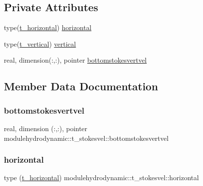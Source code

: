 \subsection*{Private Attributes}
\begin{DoxyCompactItemize}
\item 
type(\mbox{\hyperlink{structmodulehydrodynamic_1_1t__horizontal}{t\+\_\+horizontal}}) \mbox{\hyperlink{structmodulehydrodynamic_1_1t__stokesvel_a9c8ae72d899c079fe9eed738cd021514}{horizontal}}
\item 
type(\mbox{\hyperlink{structmodulehydrodynamic_1_1t__vertical}{t\+\_\+vertical}}) \mbox{\hyperlink{structmodulehydrodynamic_1_1t__stokesvel_a91dc4e35e7efe9179743bf03a1427122}{vertical}}
\item 
real, dimension(\+:,\+:), pointer \mbox{\hyperlink{structmodulehydrodynamic_1_1t__stokesvel_af5f3a19d386231a1abd4788e07168f13}{bottomstokesvertvel}}
\end{DoxyCompactItemize}


\subsection{Member Data Documentation}
\mbox{\label{structmodulehydrodynamic_1_1t__stokesvel_af5f3a19d386231a1abd4788e07168f13}} 
\subsubsection{\texorpdfstring{bottomstokesvertvel}{bottomstokesvertvel}}
{\footnotesize\ttfamily real, dimension (\+:,\+:), pointer modulehydrodynamic\+::t\+\_\+stokesvel\+::bottomstokesvertvel\hspace{0.3cm}{\ttfamily [private]}}

\mbox{\label{structmodulehydrodynamic_1_1t__stokesvel_a9c8ae72d899c079fe9eed738cd021514}} 
\subsubsection{\texorpdfstring{horizontal}{horizontal}}
{\footnotesize\ttfamily type (\mbox{\hyperlink{structmodulehydrodynamic_1_1t__horizontal}{t\+\_\+horizontal}}) modulehydrodynamic\+::t\+\_\+stokesvel\+::horizontal\hspace{0.3cm}{\ttfamily [private]}}

